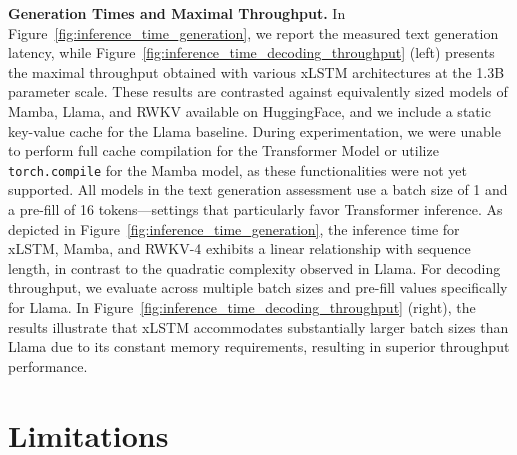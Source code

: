 \textbf{Generation Times and Maximal Throughput.} In Figure~\ref{fig:inference_time_generation}, we report the measured text generation latency, while Figure~\ref{fig:inference_time_decoding_throughput} (left) presents the maximal throughput obtained with various xLSTM architectures at the 1.3B parameter scale. These results are contrasted against equivalently sized models of Mamba, Llama, and RWKV available on HuggingFace, and we include a static key-value cache for the Llama baseline. During experimentation, we were unable to perform full cache compilation for the Transformer Model or utilize \texttt{torch.compile} for the Mamba model, as these functionalities were not yet supported. All models in the text generation assessment use a batch size of 1 and a pre-fill of 16 tokens—settings that particularly favor Transformer inference.
As depicted in Figure~\ref{fig:inference_time_generation}, the inference time for xLSTM, Mamba, and RWKV-4 exhibits a linear relationship with sequence length, in contrast to the quadratic complexity observed in Llama. For decoding throughput, we evaluate across multiple batch sizes and pre-fill values specifically for Llama. 
In Figure~\ref{fig:inference_time_decoding_throughput} (right), the results illustrate that xLSTM accommodates substantially larger batch sizes than Llama due to its constant memory requirements, resulting in superior throughput performance.

\section{Limitations}

